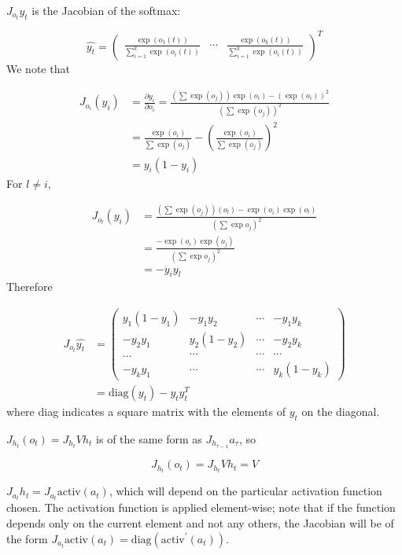 $J_{o_t}\widehat{y_t}$ is the Jacobian of the softmax:

\begin{equation*}
  \widehat{y_t} = \begin{pmatrix}
    \frac{\exp(o_1(t))}{\sum_{i=1}^k \exp(o_i(t))} & \cdots &  \frac{\exp(o_k(t))}{\sum_{i=1}^k \exp(o_i(t))}
  \end{pmatrix}^T
\end{equation*}
%
We note that

\begin{align*}
  J_{o_i}(y_i) & = \frac{\partial y_i}{\partial o_i} = \frac{(\sum \exp(o_j)) \exp(o_i) - (\exp(o_i))^2}{(\sum \exp(o_j))^2} \\
  & = \frac{\exp(o_i)}{\sum \exp(o_j)} - \left(\frac{\exp(o_i)}{\sum \exp(o_j)}\right)^2 \\
  & = y_i (1 - y_i)
\end{align*}
%
For $l \neq i$,

\begin{align*}
  J_{o_l}(y_i) & = \frac{(\sum \exp(o_j))(o_l) - \exp(o_i)\exp(o_l)}{(\sum \exp o_j)^2} \\
  & = \frac{-\exp(o_i)\exp(o_j)}{(\sum \exp o_j)^2} \\
  & = -y_i y_l
\end{align*}
%
Therefore

\begin{align*}
  J_{o_t}\widehat{y_t} & = \begin{pmatrix}
    y_1 (1 - y_1) & -y_1 y_2 & \cdots & -y_1 y_k \\
    -y_2 y_1 & y_2 (1 - y_2) & \cdots & -y_2 y_k \\
    \ldots & \cdots & \cdots & \cdots \\
    -y_k y_1 & \cdots & \cdots & y_k (1 - y_k)
  \end{pmatrix} \\
  & = \mbox{diag}(y_t) - y_t y_t^T
\end{align*}
%
where \mbox{diag} indicates a square matrix with the elements of $y_t$ on the diagonal.

$J_{h_t}(o_t) = J_{h_t}Vh_t$ is of the same form as $J_{h_{\tau - 1}} a_\tau$, so

\begin{equation*}
  J_{h_t}(o_t) = J_{h_t}Vh_t = V
\end{equation*}

$J_{a_t}h_t = J_{a_t}\mbox{activ}(a_t)$, which will depend on the particular activation function chosen. The activation function is applied element-wise; note that if the function depends only on the current element and not any others, the Jacobian will be of the form $J_{a_t}\mbox{activ}(a_t) = \mbox{diag}(\mbox{activ}^\prime(a_t))$.

